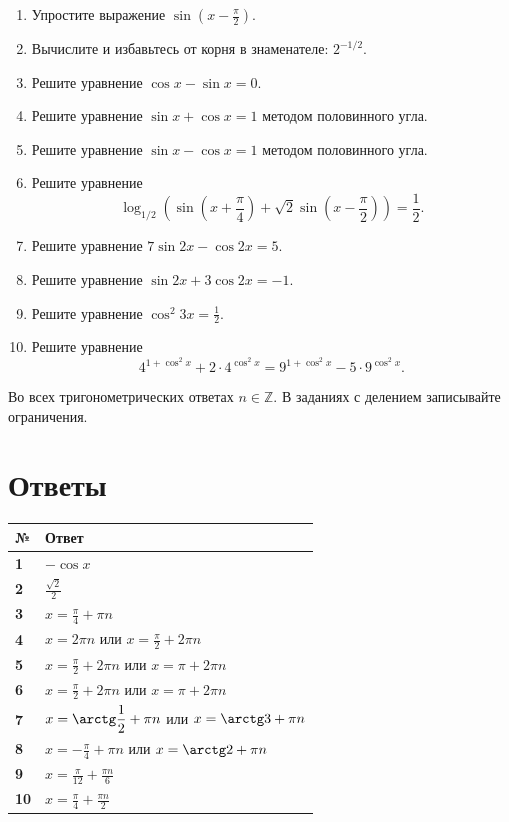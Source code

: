 \documentclass[a4paper,12pt]{article}
\newcommand{\sect}[1]{\section*{\color{darkaccent}#1}}
\begin{document}
\begin{enumerate}[label=\textcolor{darkaccent}{\bfseries\arabic*.},leftmargin=9mm,itemsep=12pt]
\item Упростите выражение $\displaystyle \sin\left(x-\frac\pi2\right)$.
\item Вычислите и избавьтесь от корня в знаменателе: $\displaystyle 2^{-1/2}$.
\item Решите уравнение $\displaystyle \cos x-\sin x=0$.
\item Решите уравнение $\displaystyle \sin x+\cos x=1$ методом половинного угла.
\item Решите уравнение $\displaystyle \sin x-\cos x=1$ методом половинного угла.
\item Решите уравнение
\[
\log_{1/2}\!\left(\sin\left(x+\frac\pi4\right)
+\sqrt2\sin\left(x-\frac\pi2\right)\right)=\frac12.
\]
\item Решите уравнение $\displaystyle 7\sin2x-\cos2x=5$.
\item Решите уравнение $\displaystyle \sin2x+3\cos2x=-1$.
\item Решите уравнение $\displaystyle \cos^2 3x=\frac12$.
\item Решите уравнение
\[
4^{1+\cos^2x}+2\cdot4^{\cos^2x}
=9^{1+\cos^2x}-5\cdot9^{\cos^2x}.
\]
\end{enumerate}

\textcolor{muted}{Во всех тригонометрических ответах $n\in\mathbb Z$. В заданиях с делением записывайте ограничения.}
\clearpage

\sect{Ответы}
\vspace{5mm}
\renewcommand{\arraystretch}{1.55}
\begin{tabularx}{\linewidth}{@{}>{\bfseries}p{12mm}X@{}}
\toprule
\textcolor{darkaccent}{№} & \textcolor{darkaccent}{Ответ} \\
\midrule
1 & $-\cos x$ \\
2 & $\displaystyle\frac{\sqrt2}{2}$ \\
3 & $\displaystyle x=\frac\pi4+\pi n$ \\
4 & $\displaystyle x=2\pi n$ или $\displaystyle x=\frac\pi2+2\pi n$ \\
5 & $\displaystyle x=\frac\pi2+2\pi n$ или $\displaystyle x=\pi+2\pi n$ \\
6 & $\displaystyle x=\frac\pi2+2\pi n$ или $\displaystyle x=\pi+2\pi n$ \\
7 & $\displaystyle x=\arctg\frac12+\pi n$ или $\displaystyle x=\arctg3+\pi n$ \\
8 & $\displaystyle x=-\frac\pi4+\pi n$ или $\displaystyle x=\arctg2+\pi n$ \\
9 & $\displaystyle x=\frac\pi{12}+\frac{\pi n}{6}$ \\
10 & $\displaystyle x=\frac\pi4+\frac{\pi n}{2}$ \\
\bottomrule
\end{tabularx}
\end{document}
